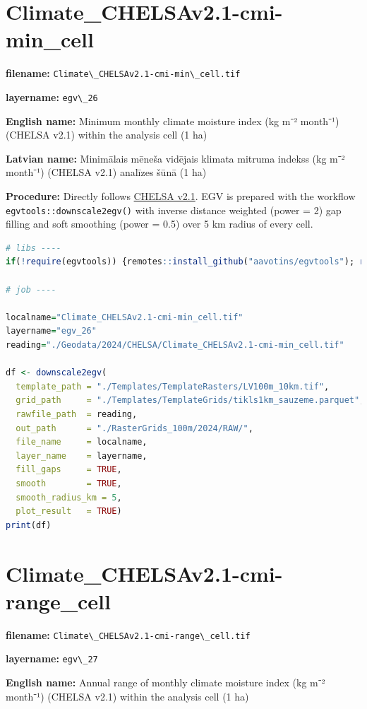 \documentclass[
]{book}
\newcommand{\passthrough}[1]{#1}
\begin{document}
\section{Climate\_CHELSAv2.1-cmi-min\_cell}\label{ch06.026}

\textbf{filename:} \passthrough{\lstinline!Climate\_CHELSAv2.1-cmi-min\_cell.tif!}

\textbf{layername:} \passthrough{\lstinline!egv\_26!}

\textbf{English name:} Minimum monthly climate moisture index (kg m⁻² month⁻¹) (CHELSA v2.1) within the analysis cell (1 ha)

\textbf{Latvian name:} Minimālais mēneša vidējais klimata mitruma indekss (kg m⁻² month⁻¹) (CHELSA v2.1) analīzes šūnā (1 ha)

\textbf{Procedure:} Directly follows \hyperref[Ch04.11]{CHELSA v2.1}. EGV is prepared with the
workflow \passthrough{\lstinline!egvtools::downscale2egv()!} with inverse distance weighted (power = 2)
gap filling and soft smoothing (power = 0.5) over 5 km radius of every cell.

\begin{lstlisting}[language=R]
# libs ----
if(!require(egvtools)) {remotes::install_github("aavotins/egvtools"); require(egvtools)}

# job ----

localname="Climate_CHELSAv2.1-cmi-min_cell.tif"
layername="egv_26"
reading="./Geodata/2024/CHELSA/Climate_CHELSAv2.1-cmi-min_cell.tif"

df <- downscale2egv(
  template_path = "./Templates/TemplateRasters/LV100m_10km.tif",
  grid_path     = "./Templates/TemplateGrids/tikls1km_sauzeme.parquet",
  rawfile_path  = reading,
  out_path      = "./RasterGrids_100m/2024/RAW/",
  file_name     = localname,
  layer_name    = layername,
  fill_gaps     = TRUE,
  smooth        = TRUE,
  smooth_radius_km = 5,
  plot_result   = TRUE)
print(df)
\end{lstlisting}

\section{Climate\_CHELSAv2.1-cmi-range\_cell}\label{ch06.027}

\textbf{filename:} \passthrough{\lstinline!Climate\_CHELSAv2.1-cmi-range\_cell.tif!}

\textbf{layername:} \passthrough{\lstinline!egv\_27!}

\textbf{English name:} Annual range of monthly climate moisture index (kg m⁻² month⁻¹) (CHELSA v2.1) within the analysis cell (1 ha)
\end{document}

